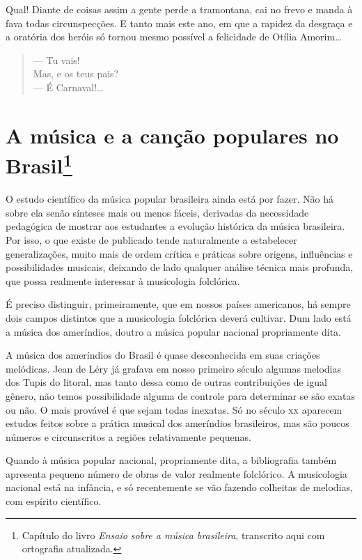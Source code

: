 Qual! Diante de coisas assim a gente perde a tramontana, cai no frevo e
manda à fava todas circunspecções. E tanto mais este ano, em que a
rapidez da desgraça e a oratória dos heróis só tornou mesmo possível a
felicidade de Otília Amorim\ldots{}

\begin{verse}
\small{
--- Tu vais!\\
Mas, e os teus pais?\\
--- É Carnaval!\ldots{}}
\end{verse}


\chapter{A música e a canção populares no Brasil\footnote{Capítulo do livro \textit{Ensaio sobre a música brasileira}, transcrito aqui com ortografia atualizada.}}

O estudo científico da música popular brasileira ainda está por fazer.
Não há sobre ela senão sínteses mais ou menos fáceis, derivadas da
necessidade pedagógica de mostrar aos estudantes a evolução histórica da
música brasileira. Por isso, o que existe de publicado tende
naturalmente a estabelecer generalizações, muito mais de ordem crítica e
práticas sobre origens, influências e possibilidades musicais, deixando
de lado qualquer análise técnica mais profunda, que possa realmente
interessar à musicologia folclórica.

É preciso distinguir, primeiramente, que em nossos países americanos, há
sempre dois campos distintos que a musicologia folclórica deverá
cultivar. Dum lado está a música dos ameríndios, doutro a música popular
nacional propriamente dita.

A música dos ameríndios do Brasil é quase desconhecida em suas criações
melódicas. Jean de Léry já grafava em nosso primeiro século algumas
melodias dos Tupis do litoral, mas tanto dessa como de outras
contribuições de igual gênero, não temos possibilidade alguma de
controle para determinar se são exatas ou não. O mais provável é que
sejam todas inexatas. Só no século \textsc{xx} aparecem estudos feitos sobre a
prática musical dos ameríndios brasileiros, mas são poucos números e
circunscritos a regiões relativamente pequenas.

Quando à música popular nacional, propriamente dita, a bibliografia
também apresenta pequeno número de obras de valor realmente folclórico.
A musicologia nacional está na infância, e só recentemente se vão
fazendo colheitas de melodias, com espírito científico.

